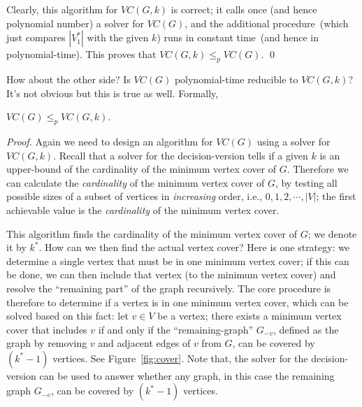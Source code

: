 Clearly, this algorithm for $VC(G, k)$ is correct; it calls once (and hence polynomial number)
a solver for $VC(G)$, and the additional procedure~(which just compares $|V_1^*|$ with the given $k$)
runs in constant time~(and hence in polynomial-time). This proves that $VC(G, k)\le_p VC(G)$. \qed

How about the other side? Is $VC(G)$ polynomial-time reducible to $VC(G, k)$? It's not obvious but 
this is true as well. Formally,
\begin{fact}
$VC(G)\le_p VC(G, k)$.
\end{fact}
\emph{Proof.}  Again we need to design an algorithm for $VC(G)$ using a solver for $VC(G, k)$.
Recall that a solver for the decision-version tells if a given $k$ is an upper-bound of the
cardinality of the minimum vertex cover of $G$. 
Therefore we can calculate the \emph{cardinality} of the minimum vertex cover of $G$,
by testing all possible sizes of a subset of vertices in \emph{increasing} order,
   i.e., $0, 1, 2, \cdots, |V|$;
the first achievable value is the \emph{cardinality} of the minimum vertex cover.

\begin{minipage}{0.8\textwidth}
	\xxx
	\xxx
	\xxx
	\xxx
	\xxx
	\xxx
\end{minipage}

This algorithm finds the cardinality of the minimum vertex cover of $G$; we denote it by $k^*$.
How can we then find the actual vertex cover? Here is one strategy:
we determine a single vertex that must be in one minimum vertex cover; if
this can be done, we can then
include that vertex (to the minimum vertex cover) and resolve the ``remaining part'' of the graph recursively.
The core procedure is therefore to determine if a vertex is in one minimum vertex cover,
which can be solved based on this fact: let $v\in V$ be a vertex; 
there exists a minimum vertex cover that includes $v$
if and only if the ``remaining-graph'' $G_{-v}$, defined as the graph by removing $v$ and adjacent edges of $v$ from $G$, can
be covered by $(k^* - 1)$ vertices. 
See Figure~\ref{fig:cover}.  
Note that, the solver for the decision-version can be used to answer 
whether any graph, in this case the remaining graph $G_{-v}$, can be covered by $(k^* - 1)$ vertices. 

